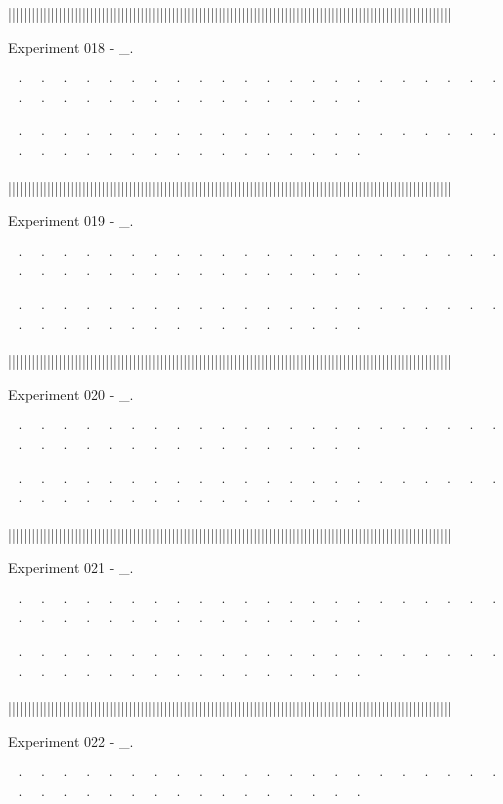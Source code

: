 ||||||||||||||||||||||||||||||||||||||||||||||||||||||||||||||||||||||||||||||||||||||||||||||||||||||||||||||||||


Experiment 018 - _. 


~· ~· ~· ~· ~· ~· ~· ~· ~· ~· ~· ~· ~· ~· ~· ~· ~· ~· ~· ~· ~· ~· ~· ~· ~· ~· ~· ~· ~· ~· ~· ~· ~· ~· ~· ~· ~· ~· 

~· ~· ~· ~· ~· ~· ~· ~· ~· ~· ~· ~· ~· ~· ~· ~· ~· ~· ~· ~· ~· ~· ~· ~· ~· ~· ~· ~· ~· ~· ~· ~· ~· ~· ~· ~· ~· ~· 



||||||||||||||||||||||||||||||||||||||||||||||||||||||||||||||||||||||||||||||||||||||||||||||||||||||||||||||||||


Experiment 019 - _. 


~· ~· ~· ~· ~· ~· ~· ~· ~· ~· ~· ~· ~· ~· ~· ~· ~· ~· ~· ~· ~· ~· ~· ~· ~· ~· ~· ~· ~· ~· ~· ~· ~· ~· ~· ~· ~· ~· 

~· ~· ~· ~· ~· ~· ~· ~· ~· ~· ~· ~· ~· ~· ~· ~· ~· ~· ~· ~· ~· ~· ~· ~· ~· ~· ~· ~· ~· ~· ~· ~· ~· ~· ~· ~· ~· ~· 



||||||||||||||||||||||||||||||||||||||||||||||||||||||||||||||||||||||||||||||||||||||||||||||||||||||||||||||||||


Experiment 020 - _. 


~· ~· ~· ~· ~· ~· ~· ~· ~· ~· ~· ~· ~· ~· ~· ~· ~· ~· ~· ~· ~· ~· ~· ~· ~· ~· ~· ~· ~· ~· ~· ~· ~· ~· ~· ~· ~· ~· 

~· ~· ~· ~· ~· ~· ~· ~· ~· ~· ~· ~· ~· ~· ~· ~· ~· ~· ~· ~· ~· ~· ~· ~· ~· ~· ~· ~· ~· ~· ~· ~· ~· ~· ~· ~· ~· ~· 



||||||||||||||||||||||||||||||||||||||||||||||||||||||||||||||||||||||||||||||||||||||||||||||||||||||||||||||||||


Experiment 021 - _. 


~· ~· ~· ~· ~· ~· ~· ~· ~· ~· ~· ~· ~· ~· ~· ~· ~· ~· ~· ~· ~· ~· ~· ~· ~· ~· ~· ~· ~· ~· ~· ~· ~· ~· ~· ~· ~· ~· 

~· ~· ~· ~· ~· ~· ~· ~· ~· ~· ~· ~· ~· ~· ~· ~· ~· ~· ~· ~· ~· ~· ~· ~· ~· ~· ~· ~· ~· ~· ~· ~· ~· ~· ~· ~· ~· ~· 



||||||||||||||||||||||||||||||||||||||||||||||||||||||||||||||||||||||||||||||||||||||||||||||||||||||||||||||||||


Experiment 022 - _. 


~· ~· ~· ~· ~· ~· ~· ~· ~· ~· ~· ~· ~· ~· ~· ~· ~· ~· ~· ~· ~· ~· ~· ~· ~· ~· ~· ~· ~· ~· ~· ~· ~· ~· ~· ~· ~· ~· 

